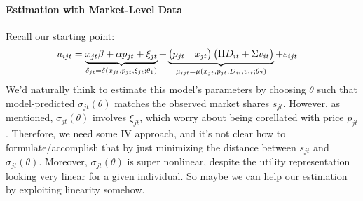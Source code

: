 \documentclass[12pt]{article}
\theoremstyle{plain}
\theoremstyle{definition}
\theoremstyle{remark}
\begin{document}
\begin{comment}
    \paragraph{$\Sigma$ Identification}
    In the more complex case with $\Sigma\neq 0$, that matrix is
    identified from within market share variation in choice
    probabilities, i.e. holding market share fixed?


  \item
    We know that
    \begin{align*}
      \delta_{jt}=x_{jt}\beta + \alpha p_{jt}+\xi_{jt}
    \end{align*}
    So given $\delta_{jt}$ estimates from step 1, recover $\beta$ and
    $\alpha$.

    Note: since we expect $p_{jt}$ and $\xi_{jt}$ to be correlated, need
    an IV for prices or an assumption about the panel/autocorrelation
    structure of $\xi_{jt}$ for identification/estimation.

    \paragraph{$\theta_1$ Identification}
    This is identified from variation across markets
\end{enumerate}
\end{comment}


\clearpage
\paragraph{Estimation with Market-Level Data}
Recall our starting point:
\begin{align*}
  u_{ijt} &=
  \underbrace{%
    x_{jt}\beta + \alpha p_{jt} +\xi_{jt}
  }_{\delta_{jt}=\delta(x_{jt},p_{jt},\xi_{jt};\theta_1)}
  +
  \underbrace{%
      \begin{pmatrix}
        p_{jt} & x_{jt}
      \end{pmatrix}
      \begin{pmatrix}
        \Pi D_{it} + \Sigma v_{it}
      \end{pmatrix}
  }_{\mu_{ijt}=\mu(x_{jt},p_{jt},D_{ii},v_{it};\theta_2)}
  +\varepsilon_{ijt}
\end{align*}
We'd naturally think to estimate this model's parameters by choosing
$\theta$ such that model-predicted $\sigma_{jt}(\theta)$ matches the
observed market shares $s_{jt}$.
However, as mentioned, $\sigma_{jt}(\theta)$ involves $\xi_{jt}$, which
worry about being corellated with price $p_{jt}$.
Therefore, we need some IV approach, and it's not clear how to
formulate/accomplish that by just minimizing the distance between
$s_{jt}$ and $\sigma_{jt}(\theta)$.
Moreover, $\sigma_{jt}(\theta)$ is super nonlinear, despite the utility
representation looking very linear for a given individual.
So maybe we can help our estimation by exploiting linearity somehow.
\end{document}
